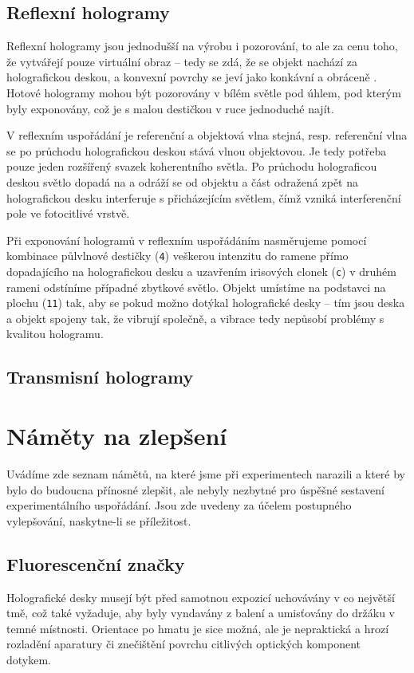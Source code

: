 \documentclass[twoside,project]{../MFFPrace}
\begin{document}
\subsection{Reflexní hologramy}
Reflexní hologramy jsou jednodušší na výrobu i pozorování, to ale za cenu toho, že vytvářejí pouze virtuální obraz -- tedy se zdá, že se objekt nachází za holografickou deskou, a konvexní povrchy se jeví jako konkávní a obráceně \cite{holography}. Hotové hologramy mohou být pozorovány v bílém světle pod úhlem, pod kterým byly exponovány, což je s malou destičkou v ruce jednoduché najít.

\medskip

V reflexním uspořádání je referenční a objektová vlna stejná, resp. referenční vlna se po průchodu holografickou deskou stává vlnou objektovou. Je tedy potřeba pouze jeden rozšířený svazek koherentního světla. Po průchodu holograficou deskou světlo dopadá na a odráží se od objektu a část odražená zpět na holografickou desku interferuje s přicházejícím světlem, čímž vzniká interferenční pole ve fotocitlivé vrstvě.

\medskip

Při exponování hologramů v reflexním uspořádáním nasměrujeme pomocí kombinace půlvlnové destičky (\texttt{4}) veškerou intenzitu do ramene přímo dopadajícího na holografickou desku a uzavřením irisových clonek (\texttt{c}) v druhém rameni odstíníme případné zbytkové světlo. Objekt umístíme na podstavci na plochu (\texttt{11}) tak, aby se pokud možno dotýkal holografické desky -- tím jsou deska a objekt spojeny tak, že vibrují společně, a vibrace tedy nepůsobí problémy s kvalitou hologramu.

\subsection{Transmisní hologramy}

\section{Náměty na zlepšení}
Uvádíme zde seznam námětů, na které jsme při experimentech narazili a které by bylo do budoucna přínosné zlepšit, ale nebyly nezbytné pro úspěšné sestavení experimentálního uspořádání. Jsou zde uvedeny za účelem postupného vylepšování, naskytne-li se příležitost.

\subsection*{Fluorescenční značky}
Holografické desky musejí být před samotnou expozicí uchovávány v co největší tmě, což také vyžaduje, aby byly vyndavány z balení a umisťovány do držáku v temné místnosti. Orientace po hmatu je sice možná, ale je nepraktická a hrozí rozladění aparatury či znečištění povrchu citlivých optických komponent dotykem.
\end{document}
